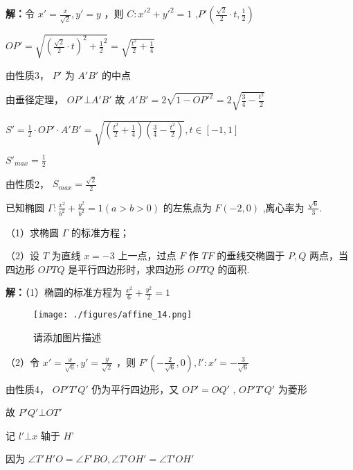 \begin{corollary}{}
\begin{example}{}
\textbf{解：}令 $\displaystyle{x'=\frac{x}{\sqrt{2}},y'=y}$ ，则 $\displaystyle{C:x'^2+y'^2=1}$ ,$\displaystyle{P'\left(\frac{\sqrt{2}}{2}\cdot t,\frac{1}{2}\right)}$

$\displaystyle{OP'=\sqrt{\left(\frac{\sqrt{2}}{2}\cdot t\right)^2+{\frac{1}{2}}^2}=\sqrt{\frac{t^2}{2}+\frac{1}{4}}}$

由性质3， $\displaystyle{P'}$ 为 $\displaystyle{A'B'}$ 的中点

由垂径定理， $\displaystyle{OP'\bot A'B'}$ 
故 $\displaystyle{A'B'=2\sqrt{1-OP'^2}=2\sqrt{\frac{3}{4}-\frac{t^2}{2}}}$

$\displaystyle{S'=\frac{1}{2}\cdot OP' \cdot A'B'=\sqrt{\left(\frac{t^2}{2}+\frac{1}{4}\right)\left(\frac{3}{4}-\frac{t^2}{2}\right)},t\in[-1,1]}$

$\displaystyle{S'_{max}=\frac{1}{2}}$

由性质2， $\displaystyle{S_{max}=\frac{\sqrt{2}}{2}}$ 
\end{example}

\begin{example}{}
已知椭圆 $\displaystyle{\Gamma:\frac{x^2}{b^2}+\frac{y^2}{b^2}=1(a>b>0)}$ 的左焦点为 $\displaystyle{F(-2,0)}$ ,离心率为 $\displaystyle{\frac{\sqrt{6}}{3}}$.

（1）求椭圆 $\displaystyle{\Gamma}$ 的标准方程；

（2）设 $\displaystyle{T}$ 为直线 $\displaystyle{x=-3}$ 上一点，过点 $\displaystyle{F}$ 作 $\displaystyle{TF}$ 的垂线交椭圆于 $\displaystyle{P,Q}$ 两点，当四边形 $\displaystyle{OPTQ}$ 是平行四边形时，求四边形 $\displaystyle{OPTQ}$ 的面积.

\textbf{解：}（1）椭圆的标准方程为 $\displaystyle{\frac{x^2}{6}+\frac{y^2}{2}=1}$
\begin{figure}[ht]
\centering
\texttt{[image: ./figures/affine\_14.png]}
\caption{请添加图片描述} \label{affine_fig14}
\end{figure}
（2）令 $\displaystyle{x'=\frac{x}{\sqrt{6}},y'=\frac{y}{\sqrt{2}}}$ ，则 $\displaystyle{F'\left(-\frac{2}{\sqrt{6}},0\right) , l':x'=-\frac{3}{\sqrt{6}}}$

由性质4， $\displaystyle{OP'T'Q'}$ 仍为平行四边形，又 $\displaystyle{OP'=OQ'}$ , $\displaystyle{OP'T'Q'}$ 为菱形

故 $\displaystyle{P'Q'\bot OT'}$

记  $\displaystyle{l'\bot x}$ 轴于 $\displaystyle{H’}$ 

因为 $\displaystyle{\angle T'H'O=\angle F'BO,\angle T'OH'=\angle T'OH'}$


\end{example}
\end{corollary}

